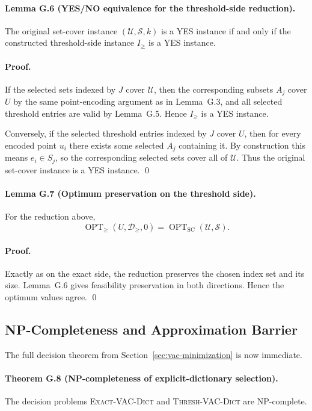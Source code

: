 \paragraph{Lemma G.6 (YES/NO equivalence for the threshold-side reduction).}
The original set-cover instance $(\mathcal U,\mathcal S,k)$ is a YES instance if and only if the constructed threshold-side instance $I_{\ge}$ is a YES instance.

\paragraph{Proof.}
If the selected sets indexed by $J$ cover $\mathcal U$, then the corresponding subsets $A_j$ cover $U$ by the same point-encoding argument as in Lemma~G.3, and all selected threshold entries are valid by Lemma~G.5. Hence $I_{\ge}$ is a YES instance.

Conversely, if the selected threshold entries indexed by $J$ cover $U$, then for every encoded point $u_i$ there exists some selected $A_j$ containing it. By construction this means $e_i\in S_j$, so the corresponding selected sets cover all of $\mathcal U$. Thus the original set-cover instance is a YES instance. \qed

\paragraph{Lemma G.7 (Optimum preservation on the threshold side).}
For the reduction above,
\[
\operatorname{OPT}_{\ge}(U,\mathcal D_{\ge},0)
=
\operatorname{OPT}_{\mathrm{SC}}(\mathcal U,\mathcal S).
\]

\paragraph{Proof.}
Exactly as on the exact side, the reduction preserves the chosen index set and its size. Lemma~G.6 gives feasibility preservation in both directions. Hence the optimum values agree. \qed

\subsection{NP-Completeness and Approximation Barrier}

The full decision theorem from Section~\ref{sec:vac-minimization} is now immediate.

\paragraph{Theorem G.8 (NP-completeness of explicit-dictionary selection).}
The decision problems \textsc{Exact-VAC-Dict} and \textsc{Thresh-VAC-Dict} are NP-complete.

